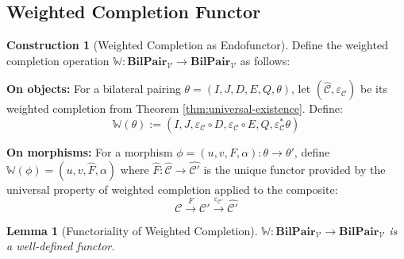\documentclass[11pt]{article}
\theoremstyle{plain}
\newtheorem{lemma}[theorem]{Lemma}
\theoremstyle{definition}
\newtheorem{construction}[theorem]{Construction}
\theoremstyle{remark}
\newcommand{\V}{\mathcal{V}}
\newcommand{\C}{\mathcal{C}}
\newcommand{\wh}[1]{\widehat{#1}}
\begin{document}
\subsection{Weighted Completion Functor}

\begin{construction}[Weighted Completion as Endofunctor]\label{const:completion-functor}
Define the weighted completion operation $\mathbb{W} : \mathbf{BilPair}_\V \to \mathbf{BilPair}_\V$ as follows:

\textbf{On objects:} For a bilateral pairing $\theta = (I, J, D, E, Q, \theta)$, let $(\wh{\C}, \varepsilon_\C)$ be its weighted completion from Theorem \ref{thm:universal-existence}. Define:
$$\mathbb{W}(\theta) := (I, J, \varepsilon_\C \circ D, \varepsilon_\C \circ E, Q, \varepsilon_\C^* \theta)$$

\textbf{On morphisms:} For a morphism $\phi = (u, v, F, \alpha) : \theta \to \theta'$, define $\mathbb{W}(\phi) = (u, v, \wh{F}, \alpha)$ where $\wh{F} : \wh{\C} \to \wh{\C'}$ is the unique functor provided by the universal property of weighted completion applied to the composite:
$$\C \xrightarrow{F} \C' \xrightarrow{\varepsilon_{\C'}} \wh{\C'}$$
\end{construction}

\begin{lemma}[Functoriality of Weighted Completion]\label{lem:completion-functorial}
$\mathbb{W} : \mathbf{BilPair}_\V \to \mathbf{BilPair}_\V$ is a well-defined functor.
\end{lemma}
\end{document}
